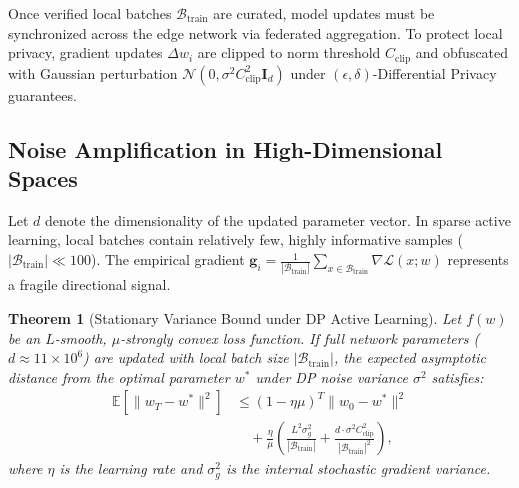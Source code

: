 \documentclass[conference]{IEEEtran}
\newtheorem{theorem}{Theorem}
\begin{document}
Once verified local batches $\mathcal{B}_{\mathrm{train}}$ are curated, model updates must be synchronized across the edge network via federated aggregation. To protect local privacy, gradient updates $\Delta w_i$ are clipped to norm threshold $C_{\mathrm{clip}}$ and obfuscated with Gaussian perturbation $\mathcal{N}(0, \sigma^2 C_{\mathrm{clip}}^2 \mathbf{I}_d)$ under $(\epsilon, \delta)$-Differential Privacy guarantees.

\subsection{Noise Amplification in High-Dimensional Spaces}
Let $d$ denote the dimensionality of the updated parameter vector. In sparse active learning, local batches contain relatively few, highly informative samples ($|\mathcal{B}_{\mathrm{train}}| \ll 100$). The empirical gradient $\mathbf{g}_i = \frac{1}{|\mathcal{B}_{\mathrm{train}}|} \sum_{x \in \mathcal{B}_{\mathrm{train}}} \nabla \mathcal{L}(x; w)$ represents a fragile directional signal.

\begin{theorem}[Stationary Variance Bound under DP Active Learning]
Let $f(w)$ be an $L$-smooth, $\mu$-strongly convex loss function. If full network parameters ($d \approx 11 \times 10^6$) are updated with local batch size $|\mathcal{B}_{\mathrm{train}}|$, the expected asymptotic distance from the optimal parameter $w^*$ under DP noise variance $\sigma^2$ satisfies:
\begin{equation}
\begin{aligned}
\mathbb{E}\left[\|w_T - w^*\|^2\right] &\le (1 - \eta \mu)^T \|w_0 - w^*\|^2 \\
&\quad + \frac{\eta}{\mu} \left( \frac{L^2 \sigma_g^2}{|\mathcal{B}_{\mathrm{train}}|} + \frac{d \cdot \sigma^2 C_{\mathrm{clip}}^2}{|\mathcal{B}_{\mathrm{train}}|^2} \right),
\end{aligned}
\label{eq:dp_noise_bound}
\end{equation}
where $\eta$ is the learning rate and $\sigma_g^2$ is the internal stochastic gradient variance.
\end{theorem}
\end{document}
